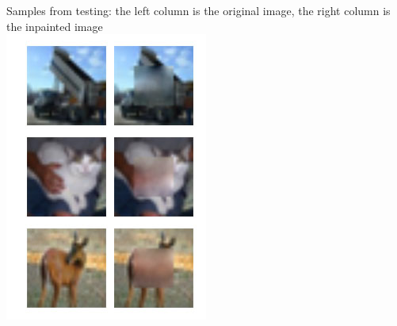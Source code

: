 \documentclass[10pt,twocolumn,letterpaper]{article}
\begin{document}
Samples from testing: the left column is the original image, the right column is the inpainted image \\
\includegraphics[width=0.8\linewidth]{baseline_test.jpg} 
\end{document}
